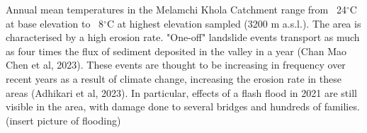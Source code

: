 \bsk

Annual mean temperatures in the Melamchi Khola Catchment range from ~24$^{\circ}$C at base elevation to ~8$^{\circ}$C at highest elevation sampled (3200 m a.s.l.). The area is characterised by a high erosion rate. "One-off" landslide events transport as much as four times the flux of sediment deposited in the valley in a year (Chan Mao Chen et al, 2023). These events are thought to be increasing in frequency over recent years as a result of climate change, increasing the erosion rate in these areas (Adhikari et al, 2023). In particular, effects of a flash flood in 2021 are still visible in the area, with damage done to several bridges and hundreds of families. (insert picture of flooding)




















